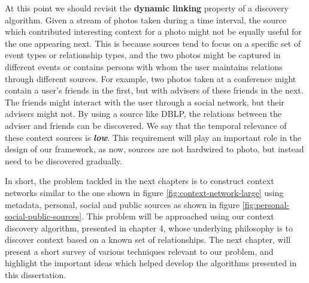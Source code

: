 At this point we should revisit the \textbf{dynamic linking} property of a discovery algorithm. Given a stream of photos taken during a time interval, the source which contributed interesting context for a photo might not be equally useful for the one appearing next. This is because sources tend to focus on a specific set of event types or relationship types, and the two photos might be captured in different events or contains persons with whom the user maintains relations through different sources. For example, two photos taken at a conference might contain a user's friends in the first, but with advisers of these friends in the next. The friends might interact with the user through a social network, but their advisers might not. By using a source like DBLP, the relations between the adviser and friends can be discovered. We say that the temporal relevance of these context sources is \textbf{\textit{low}}. This requirement will play an important role in the design of our framework, as now, sources are not hardwired to photo, but instead need to be discovered gradually.

In short, the problem tackled in the next chapters is to construct context networks similar to the one shown in figure \ref{fig:context-network-large} using metadata, personal, social and public sources as shown in figure \ref{fig:personal-social-public-sources}. This problem will be approached using our context discovery algorithm, presented in chapter 4, whose underlying philosophy is to discover context based on a known set of relationships. The next chapter, will present a short survey of various techniques relevant to our problem, and highlight the important ideas which helped develop the algorithms presented in this dissertation.




